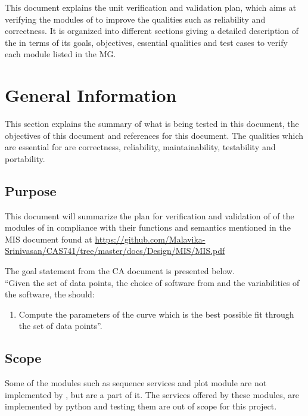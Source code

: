 \documentclass[12pt, titlepage]{article}
\begin{document}
This document explains the unit verification and validation plan, which aims at 
verifying the modules of \famname{} to improve the qualities such as 
reliability and correctness. It is organized into different 
sections giving a detailed description of the \famname{} in terms of its 
goals, objectives, essential qualities and test cases to verify each module 
listed in the MG. 



\section{General Information}

This section explains the summary of what is being tested in this document, the 
objectives of this document and references for this document. The qualities 
which are essential for \famname{} are correctness, reliability, 
maintainability, testability and portability.


\subsection{Purpose}

This document will summarize the plan for verification and validation of
of the modules of \famname{} in compliance with their functions and semantics 
mentioned in the MIS document found at 
\url{https://github.com/Malavika-Srinivasan/CAS741/tree/master/docs/Design/MIS/MIS.pdf}

The goal statement from the CA document is presented below.\\
\noindent ``Given the set of data points, the choice of software from 
\famname{} and the variabilities of the software, the \famname{} should:

\begin{enumerate}
	
	\item Compute the parameters of the curve which is the best possible fit 
	through the set of data points''.
\end{enumerate}


\subsection{Scope}

Some of the modules such as sequence services and plot module are not 
implemented by \famname{}, but are a part of it. The services offered by these 
modules, are implemented by python and testing them are out of scope for this 
project.
\end{document}
